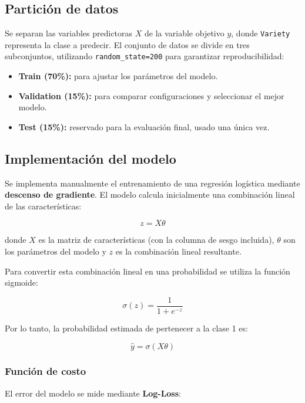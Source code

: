 \documentclass[journal]{IEEEtran}
\begin{document}
\subsection{Partición de datos}
Se separan las variables predictoras $X$ de la variable objetivo $y$, donde \texttt{Variety} representa la clase a predecir. El conjunto de datos se divide en tres subconjuntos, utilizando \texttt{random\_state=200} para garantizar reproducibilidad:
\begin{itemize}
    \item \textbf{Train (70\%):} para ajustar los parámetros del modelo.
    \item \textbf{Validation (15\%):} para comparar configuraciones y seleccionar el mejor modelo.
    \item \textbf{Test (15\%):} reservado para la evaluación final, usado una única vez.
\end{itemize}

\subsection{Implementación del modelo}

Se implementa manualmente el entrenamiento de una regresión logística mediante \textbf{descenso de gradiente}. El modelo calcula inicialmente una combinación lineal de las características:

\begin{equation}
z = X\theta
\label{eq:linear_combination}
\end{equation}

donde $X$ es la matriz de características (con la columna de sesgo incluida), $\theta$ son los parámetros del modelo y $z$ es la combinación lineal resultante.

Para convertir esta combinación lineal en una probabilidad se utiliza la función sigmoide:

\begin{equation}
\sigma(z) = \frac{1}{1+e^{-z}}
\label{eq:sigmoid}
\end{equation}

Por lo tanto, la probabilidad estimada de pertenecer a la clase 1 es:

\begin{equation}
\hat{y} = \sigma(X\theta)
\label{eq:yhat}
\end{equation}

\subsubsection{Función de costo}
El error del modelo se mide mediante \textbf{Log-Loss}:
\end{document}
